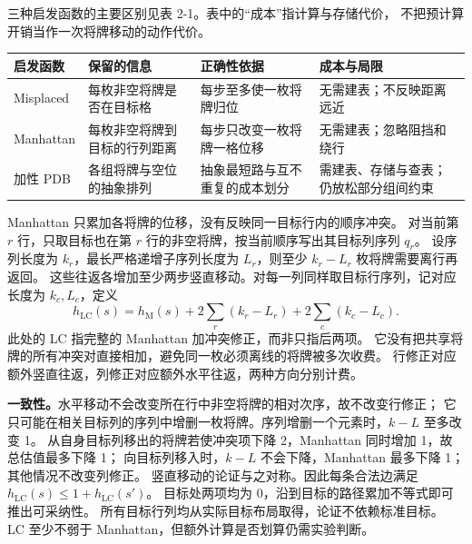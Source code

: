 三种启发函数的主要区别见表 2-1。表中的“成本”指计算与存储代价，
不把预计算开销当作一次将牌移动的动作代价。
\par\noindent\begin{minipage}{\linewidth}
\begin{center}
{\fontsize{9bp}{12bp}\selectfont
\setlength{\tabcolsep}{4bp}
\begin{tabular}{p{64bp}p{98bp}p{98bp}p{94bp}}
\toprule
\textbf{启发函数} & \textbf{保留的信息} & \textbf{正确性依据} & \textbf{成本与局限} \\
\midrule
Misplaced & 每枚非空将牌是否在目标格 & 每步至多使一枚将牌归位 & 无需建表；不反映距离远近 \\
Manhattan & 每枚非空将牌到目标的行列距离 & 每步只改变一枚将牌一格位移 & 无需建表；忽略阻挡和绕行 \\
加性 PDB & 各组将牌与空位的抽象排列 & 抽象最短路与互不重复的成本划分 & 需建表、存储与查表；仍放松部分组间约束 \\
\bottomrule
\end{tabular}}
\end{center}
\end{minipage}\par
\endgroup


\begingroup
\setlength{\parskip}{3bp}
\par\vspace{2bp}

Manhattan 只累加各将牌的位移，没有反映同一目标行内的顺序冲突。
对当前第 $r$ 行，只取目标也在第 $r$ 行的非空将牌，按当前顺序写出其目标列序列 $q_r$。
设序列长度为 $k_r$，最长严格递增子序列长度为 $L_r$，则至少 $k_r-L_r$ 枚将牌需要离行再返回。
这些往返各增加至少两步竖直移动。对每一列同样取目标行序列，记对应长度为 $k_c,L_c$，定义
\[
 h_{\mathrm{LC}}(s)=h_{\mathrm{M}}(s)
 +2\sum_r(k_r-L_r)+2\sum_c(k_c-L_c).
\]
此处的 LC 指完整的 Manhattan 加冲突修正，而非只指后两项。
它没有把共享将牌的所有冲突对直接相加，避免同一枚必须离线的将牌被多次收费。
行修正对应额外竖直往返，列修正对应额外水平往返，两种方向分别计费。

\textbf{一致性。}水平移动不会改变所在行中非空将牌的相对次序，故不改变行修正；
它只可能在相关目标列的序列中增删一枚将牌。序列增删一个元素时，$k-L$ 至多改变 1。
从自身目标列移出的将牌若使冲突项下降 2，Manhattan 同时增加 1，故总估值最多下降 1；
向目标列移入时，$k-L$ 不会下降，Manhattan 最多下降 1；其他情况不改变列修正。
竖直移动的论证与之对称。因此每条合法边满足 $h_{\mathrm{LC}}(s)\leq1+h_{\mathrm{LC}}(s')$。
目标处两项均为 0，沿到目标的路径累加不等式即可推出可采纳性。
所有目标行列均从实际目标布局取得，论证不依赖标准目标。
LC 至少不弱于 Manhattan，但额外计算是否划算仍需实验判断。

